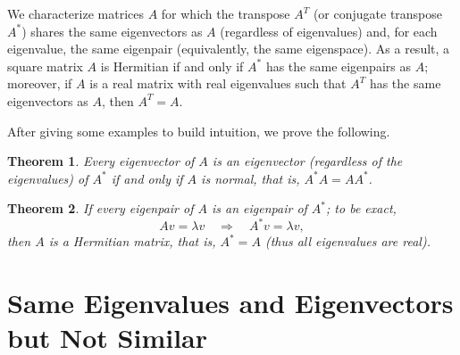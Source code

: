 \documentclass{article}
\newtheorem{theorem}{Theorem}
\begin{document}
We characterize matrices $A$ for which the transpose $A^T$ (or conjugate transpose $A^*$) shares the same eigenvectors as $A$ (regardless of eigenvalues) and, for each eigenvalue, the same eigenpair (equivalently, the same eigenspace). As a result, a square matrix $A$ is Hermitian if and only if $A^*$ has the same eigenpairs as $A$; moreover, if $A$ is a real matrix with real eigenvalues such that $A^T$ has the same eigenvectors as $A$, then $A^T = A$.


\newpage

After giving some examples to build intuition, we prove the following.

\begin{theorem}\label{Thm:Normality}
Every eigenvector  of $A$ is an eigenvector (regardless of the eigenvalues) of $A^*$ if and only if $A$ is \emph{normal},
that is,  $A^*A=AA^*$.
\end{theorem}


\begin{theorem}\label{Thm:Normality2}
If every eigenpair of $A$ is an eigenpair of $A^*$; to be exact,
\begin{equation*}
Av = \lambda v
 \quad \Rightarrow \quad
A^*v = \lambda v,
\end{equation*}
then $A$ is a Hermitian matrix, that is, $A^*=A$ (thus all eigenvalues are real).
\end{theorem}











\section{Same Eigenvalues and Eigenvectors but Not Similar}
\end{document}
